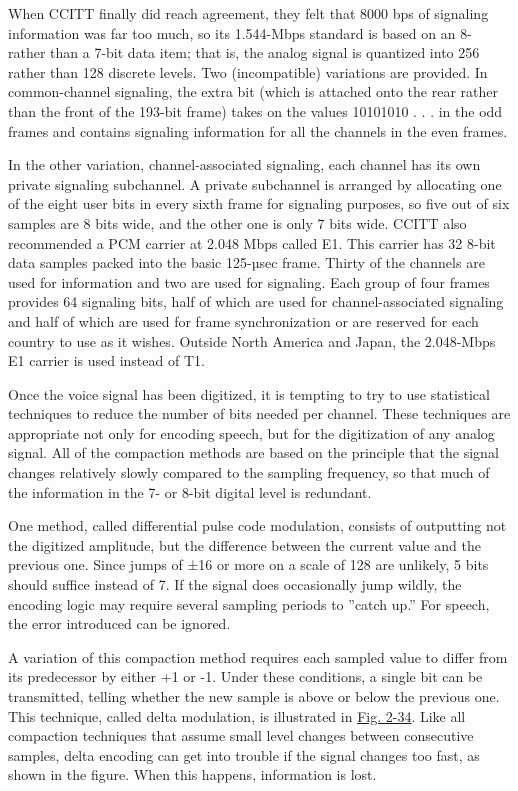 \documentclass[b5paper,11pt]{memoir}
\begin{document}
When CCITT finally did reach agreement, they felt that 8000 bps of
signaling information was far too much, so its 1.544-Mbps standard is
based on an 8- rather than a 7-bit data item; that is, the analog signal
is quantized into 256 rather than 128 discrete levels. Two
(incompatible) variations are provided. In {common-channel signaling},
the extra bit (which is attached onto the rear rather than the front of
the 193-bit frame) takes on the values 10101010 . . . in the odd frames
and contains signaling information for all the channels in the even
frames.

In the other variation, {channel-associated signaling}, each channel has
its own private signaling subchannel. A private subchannel is arranged
by allocating one of the eight user bits in every sixth frame for
signaling purposes, so five out of six samples are 8 bits wide, and the
other one is only 7 bits wide. CCITT also recommended a PCM carrier at
2.048 Mbps called {E1}. This carrier has 32 8-bit data samples packed
into the basic 125{-}µsec frame. Thirty of the channels are used for
information and two are used for signaling. Each group of four frames
provides 64 signaling bits, half of which are used for
channel-associated signaling and half of which are used for frame
synchronization or are reserved for each country to use as it wishes.
Outside North America and Japan, the 2.048-Mbps E1 carrier is used
instead of T1.

Once the voice signal has been digitized, it is tempting to try to use
statistical techniques to reduce the number of bits needed per channel.
These techniques are appropriate not only for encoding speech, but for
the digitization of any analog signal. All of the compaction methods are
based on the principle that the signal changes relatively slowly
compared to the sampling frequency, so that much of the information in
the 7- or 8-bit digital level is redundant.

One method, called {differential pulse code modulation}, consists of
outputting not the digitized amplitude, but the difference between the
current value and the previous one. Since jumps of ±16 or more on a
scale of 128 are unlikely, 5 bits should suffice instead of 7. If the
signal does occasionally jump wildly, the encoding logic may require
several sampling periods to ''catch up.'' For speech, the error
introduced can be ignored.

A variation of this compaction method requires each sampled value to
differ from its predecessor by either +1 or -1. Under these conditions,
a single bit can be transmitted, telling whether the new sample is above
or below the previous one. This technique, called {delta modulation}, is
illustrated in
\protect\hyperlink{0130661023_ch02lev1sec5.htmlux5cux23ch02fig34}{Fig.
2-34}. Like all compaction techniques that assume small level changes
between consecutive samples, delta encoding can get into trouble if the
signal changes too fast, as shown in the figure. When this happens,
information is lost.
\end{document}
